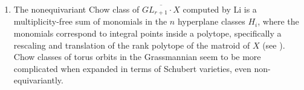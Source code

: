 \documentclass[12pt]{amsart}
\theoremstyle{plain}
\theoremstyle{definition}
\theoremstyle{remark}
\begin{document}
\begin{enumerate}
   Our method shows that the map $[\overline{GL_{r+1}\cdot X}]^{\dagger}$ is often more natural to describe than the $GL_{r+1}$-equivariant class itself, and can be computed in terms of certain polynomial expansions and truncations (see ). This is particularly pleasant in the case where the matroid of $X$ is a Schubert matroid (see  for a representative example). Our expressions for $[\overline{GL_{r+1}\cdot X}]^{\dagger}$ are motivated by the small quantum cohomology of projective space, and we have a self-contained expository account of this connection in  in the special case of a uniform matroid. 
   \item 
   The nonequivariant Chow class of $\overline{GL_{r+1}\cdot X}$ computed by Li \cite{Binglin} is a multiplicity-free sum of monomials in the $n$ hyperplane classes $H_i$, where the monomials correspond to integral points inside a polytope, specifically a rescaling and translation of the rank polytope of the matroid of $X$ (see ). Chow classes of torus orbits in the Grassmannian seem to be more complicated when expanded in terms of Schubert varieties, even non-equivariantly.
   

\end{enumerate}
\end{document}

